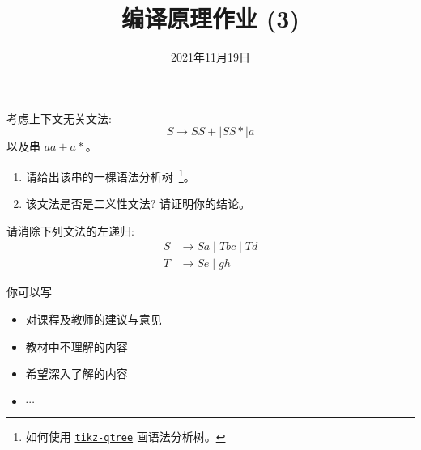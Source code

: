 \documentclass[a4paper, justified]{tufte-handout}
\title{编译原理作业 (3)}
\date{2021年11月19日}
\begin{document}
\maketitle
\noplagiarism %
\begin{abstract}
\end{abstract}
\beginrequired

\begin{problem}[\score{10 = 5 + 5}]
  考虑上下文无关文法:
  \[
    S \to S S + \mid S S \ast \mid a
  \]
  以及串 $a a + a \ast$。

  \begin{enumerate}[(1)]
    \item 请给出该串的一棵语法分析树~\footnote{如何使用 \href{https://mirrors.hit.edu.cn/CTAN/graphics/pgf/contrib/tikz-qtree/tikz-qtree-manual.pdf}{\texttt{tikz-qtree}} 画语法分析树。}。
    \item 该文法是否是二义性文法? 请证明你的结论。
  \end{enumerate}
\end{problem}

\begin{solution}
\end{solution}

\begin{problem}[\score{10}]
  请消除下列文法的左递归:
  \begin{align*}
    S &\to Sa \mid Tbc \mid Td \\[8pt]
    T &\to Se \mid gh
  \end{align*}
\end{problem}

\begin{solution}
\end{solution}



\beginfb

你可以写
\begin{itemize}
  \item 对课程及教师的建议与意见
  \item 教材中不理解的内容
  \item 希望深入了解的内容
  \item $\cdots$
\end{itemize}
\end{document}
